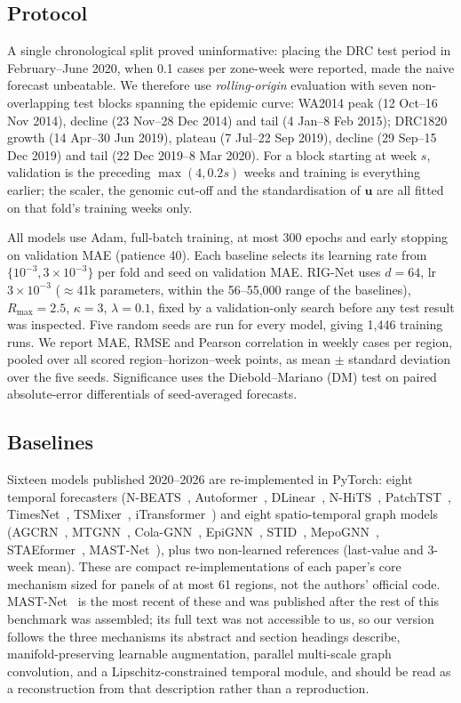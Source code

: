 \documentclass[conference]{IEEEtran}
\begin{document}
\subsection{Protocol}

A single chronological split proved uninformative: placing the DRC test period in February--June 2020, when 0.1 cases per zone-week were reported, made the naive forecast unbeatable. We therefore use \emph{rolling-origin} evaluation with seven non-overlapping test blocks spanning the epidemic curve: WA2014 peak (12 Oct--16 Nov 2014), decline (23 Nov--28 Dec 2014) and tail (4 Jan--8 Feb 2015); DRC1820 growth (14 Apr--30 Jun 2019), plateau (7 Jul--22 Sep 2019), decline (29 Sep--15 Dec 2019) and tail (22 Dec 2019--8 Mar 2020). For a block starting at week $s$, validation is the preceding $\max(4,0.2s)$ weeks and training is everything earlier; the scaler, the genomic cut-off and the standardisation of $\mathbf{u}$ are all fitted on that fold's training weeks only.

All models use Adam, full-batch training, at most 300 epochs and early stopping on validation MAE (patience 40). Each baseline selects its learning rate from $\{10^{-3},3\times10^{-3}\}$ per fold and seed on validation MAE. RIG-Net uses $d=64$, lr $3\times10^{-3}$ ($\approx$41k parameters, within the 56--55{,}000 range of the baselines), $R_{\max}=2.5$, $\kappa=3$, $\lambda=0.1$, fixed by a validation-only search before any test result was inspected. Five random seeds are run for every model, giving 1{,}446 training runs. We report MAE, RMSE and Pearson correlation in weekly cases per region, pooled over all scored region--horizon--week points, as mean $\pm$ standard deviation over the five seeds. Significance uses the Diebold--Mariano (DM) test on paired absolute-error differentials of seed-averaged forecasts.

\subsection{Baselines}

Sixteen models published 2020--2026 are re-implemented in PyTorch: eight temporal forecasters (N-BEATS~\cite{nbeats}, Autoformer~\cite{autoformer}, DLinear~\cite{dlinear}, N-HiTS~\cite{nhits}, PatchTST~\cite{patchtst}, TimesNet~\cite{timesnet}, TSMixer~\cite{tsmixer}, iTransformer~\cite{itransformer}) and eight spatio-temporal graph models (AGCRN~\cite{agcrn}, MTGNN~\cite{mtgnn}, Cola-GNN~\cite{colagnn}, EpiGNN~\cite{epignn}, STID~\cite{stid}, MepoGNN~\cite{mepognn}, STAEformer~\cite{staeformer}, MAST-Net~\cite{mastnet}), plus two non-learned references (last-value and 3-week mean). These are compact re-implementations of each paper's core mechanism sized for panels of at most 61 regions, not the authors' official code. MAST-Net~\cite{mastnet} is the most recent of these and was published after the rest of this benchmark was assembled; its full text was not accessible to us, so our version follows the three mechanisms its abstract and section headings describe, manifold-preserving learnable augmentation, parallel multi-scale graph convolution, and a Lipschitz-constrained temporal module, and should be read as a reconstruction from that description rather than a reproduction.
\end{document}
